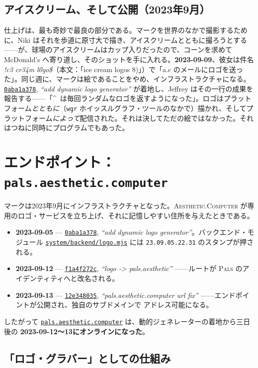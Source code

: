 \documentclass[10pt,letterpaper,twocolumn]{article}
\newcommand{\ac}{\textsc{Aesthetic}{\color{acpink}.}\textsc{Computer}}
\newcommand{\pals}{\textsc{Pals}}
\newcommand{\commit}[2]{\href{https://github.com/whistlegraph/aesthetic-computer/commit/#1}{\texttt{#1}}, \emph{``#2''}}
\newcommand{\repofile}[1]{\href{https://github.com/whistlegraph/aesthetic-computer/blob/main/#1}{\texttt{#1}}}
\begin{document}
\subsection{アイスクリーム、そして公開（2023年9月）}
仕上げは、最も奇妙で最良の部分である。マークを世界のなかで撮影するために、Niki はそれを歩道に原寸大で描き、アイスクリームとともに撮ろうとする——が、球場のアイスクリームはカップ入りだったので、コーンを求めて McDonald's へ寄り道し、そのショットを手に入れる。\textbf{2023-09-09}、彼女は件名 \emph{!c3 cr34m l0go\$}（本文：「ice cream logos 8)」）で「a.c のメールにロゴを送った」。同じ週に、マークは絵であることをやめ、インフラストラクチャになる。\commit{0aba1a378}{add dynamic logo generator} が着地し、Jeffrey はその一行の成果を報告する——「\^{}\ は毎回ランダムなロゴを返すようになった」。ロゴはプラットフォーム\emph{とともに}（\texttt{wgr} ホイッスルグラフ・ツールのなかで）描かれ、そしてプラットフォーム\emph{によって}配信された。それは決してただの絵ではなかった。それはつねに同時にプログラムでもあった。

\section{エンドポイント：\texttt{pals.aesthetic.computer}}

マークは2023年9月にインフラストラクチャとなった。\ac{} が専用のロゴ・サービスを立ち上げ、それに記憶しやすい住所を与えたときである。

\begin{itemize}
  \item \textbf{2023-09-05} --- \commit{0aba1a378}{add dynamic logo
        generator}。バックエンド・モジュール \repofile{system/backend/logo.mjs}
        には \texttt{23.09.05.22.31} のスタンプが押される。
  \item \textbf{2023-09-12} --- \commit{f1a4f272c}{logo -> pals.aesthetic}
        ——ルートが \pals{} のアイデンティティへと改名される。
  \item \textbf{2023-09-13} --- \commit{12e348035}{pals.aesthetic.computer
        url fix} ——エンドポイントが公開され、独自のサブドメインで
        アドレス可能になる。
\end{itemize}

\noindent したがって \href{https://pals.aesthetic.computer}{\texttt{pals.aesthetic.computer}}
は、動的ジェネレーターの着地から三日後の \textbf{2023-09-12〜13にオンラインになった}。

\subsection{「ロゴ・グラバー」としての仕組み}
\end{document}
